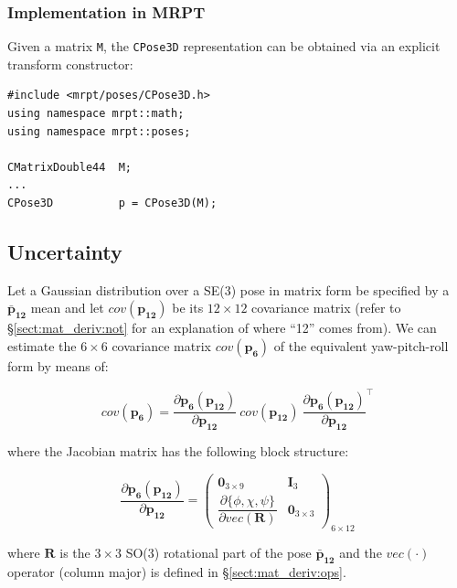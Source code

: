 \documentclass[a4paper,11pt]{report}
\begin{document}
\subsubsection{Implementation in MRPT}

Given a matrix \texttt{M}, the \texttt{CPose3D} representation can be obtained via
an explicit transform constructor:

\begin{lstlisting}
#include <mrpt/poses/CPose3D.h>
using namespace mrpt::math;
using namespace mrpt::poses;

CMatrixDouble44  M;
...
CPose3D          p = CPose3D(M);
\end{lstlisting}

\subsection{Uncertainty}
\label{sect:jacob.p6_p12}

Let a Gaussian distribution over a SE(3) pose in matrix form be specified 
by a $\mathbf{\bar{p}_{12}}$ mean and let $cov(\mathbf{p_{12}})$ be its $12 \times 12$ covariance matrix (refer to \S\ref{sect:mat_deriv:not} for an explanation of where ``12'' comes from). We can estimate the $6 \times 6$  covariance matrix $cov(\mathbf{p_6})$ of the equivalent yaw-pitch-roll form by means of:

\begin{equation}
cov(\mathbf{p_{6}}) =
\frac{\partial \mathbf{p_{6}}(\mathbf{p_{12}}) }{\partial \mathbf{p_{12}}} ~
cov(\mathbf{p_{12}})  ~
\frac{\partial \mathbf{p_{6}}(\mathbf{p_{12}}) }{\partial \mathbf{p_{12}}}^\top
\end{equation}

\noindent where the Jacobian matrix has the following block structure:

\begin{equation}
\label{eq:jac_p6_p12}
\frac{\partial \mathbf{p_{6}}(\mathbf{p_{12}}) }{\partial \mathbf{p_{12}}} =
\left(
\begin{array}{cc}
\mathbf{0}_{3 \times 9} & \mathbf{I}_3 \\
\dfrac{\partial \{ \phi,\chi,\psi \} }{\partial vec(\mathbf{R})} & \mathbf{0}_{3 \times 3}
\end{array}
\right)_{6 \times 12}
\end{equation}

\noindent where $\mathbf{R}$ is the $3 \times 3$ SO(3) rotational part of the pose $\mathbf{\bar{p}_{12}}$ and the $vec(\cdot)$ operator (column major) is defined in \S\ref{sect:mat_deriv:ops}.
\end{document}
